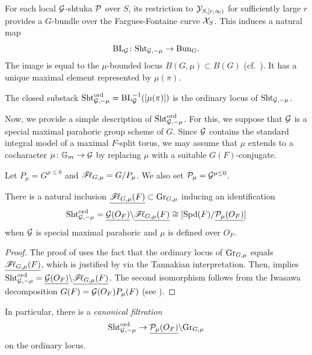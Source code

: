 \documentclass[12pt,reqno]{amsart}
\begin{document}
For each local ${\mathcal{G}}$-shtuka ${\mathcal{P}}$ over $S$, its restriction to ${\mathcal{Y}}_{S, [r, \infty)}$ for sufficiently large $r$ provides a $G$-bundle over the Fargues-Fontaine curve ${\mathcal{X}}_S$. This induces a natural map 
\begin{equation} \label{eq:Beauville_Laszlo}
    {\operatorname{BL}}_{{\mathcal{G}}} \colon {\operatorname{Sht}}_{{\mathcal{G}}, -\mu} \to {\operatorname{Bun}}_G. 
\end{equation}
The image is equal to the $\mu$-bounded locus $B(G, \mu) \subset B(G)$ (cf.\ \cite[Proposition A.9]{Sch18}). It has a unique maximal element represented by $\mu(\pi)$. 

\begin{defi} \label{defi:ord_locus_stack}
    The closed substack ${\operatorname{Sht}}_{{\mathcal{G}}, -\mu}^{\operatorname{ord}} = {\operatorname{BL}}_{{\mathcal{G}}}^{-1}([\mu(\pi)])$ is the ordinary locus of ${\operatorname{Sht}}_{{\mathcal{G}}, -\mu}$. 
\end{defi}

Now, we provide a simple description of ${\operatorname{Sht}}_{{\mathcal{G}}, -\mu}^{\operatorname{ord}}$. For this, we suppose that ${\mathcal{G}}$ is a special maximal parahoric group scheme of $G$. Since ${\mathcal{G}}$ contains the standard integral model of a maximal $F$-split torus, we may assume that $\mu$ extends to a cocharacter $\mu \colon \mathbb{G}_m \to {\mathcal{G}}$ by replacing $\mu$ with a suitable $G(F)$-conjugate. 

Let $P_{\mu} = G^{\mu \leq 0}$ and ${\mathscr{F}\!\ell}_{G, \mu} = G / P_{\mu}$. We also set ${\mathcal{P}}_{\mu} = {\mathcal{G}}^{\mu \leq 0}$. 

\begin{prop} \label{prop:ordinary_locus}
    There is a natural inclusion ${\underline{{\mathscr{F}\!\ell}_{G, \mu}(F)}} \subset {\operatorname{Gr}}_{G, \mu}$ inducing an identification 
    \[
        {\operatorname{Sht}}_{{\mathcal{G}}, -\mu}^{\operatorname{ord}} = {\underline{{\mathcal{G}}(O_F)}} \backslash {\underline{{\mathscr{F}\!\ell}_{G, \mu}(F)}} \cong [{\operatorname{Spd}}(F) / {\underline{{\mathcal{P}}_{\mu}(O_F)}}]
    \]
    when ${\mathcal{G}}$ is special maximal parahoric and $\mu$ is defined over $O_F$. 
\end{prop}
\begin{proof}
    The proof of \cite[Corollary IX.7.3]{FS24} uses the fact that the ordinary locus of ${\operatorname{Gr}}_{G, \mu}$ equals ${\underline{{\mathscr{F}\!\ell}_{G, \mu}(F)}}$, which is justified by \cite[Proposition 4.7]{GI23} via the Tannakian interpretation. Then,  implies ${\operatorname{Sht}}_{{\mathcal{G}}, -\mu}^{\operatorname{ord}} = {\underline{{\mathcal{G}}(O_F)}} \backslash {\underline{{\mathscr{F}\!\ell}_{G, \mu}(F)}}$. The second isomorphism follows from the Iwasawa decomposition $G(F) = {\mathcal{G}}(O_F) P_\mu(F)$ (see \cite[Theorem 5.3.4]{KP23}). 
\end{proof}

In particular, there is a \textit{canonical filtration}
\[
    {\operatorname{Sht}}_{{\mathcal{G}}, -\mu}^{\operatorname{ord}} \to {\underline{{\mathcal{P}}_\mu(O_F)}} \backslash {\operatorname{Gr}}_{G, \mu}
\]
on the ordinary locus. 
\end{document}
